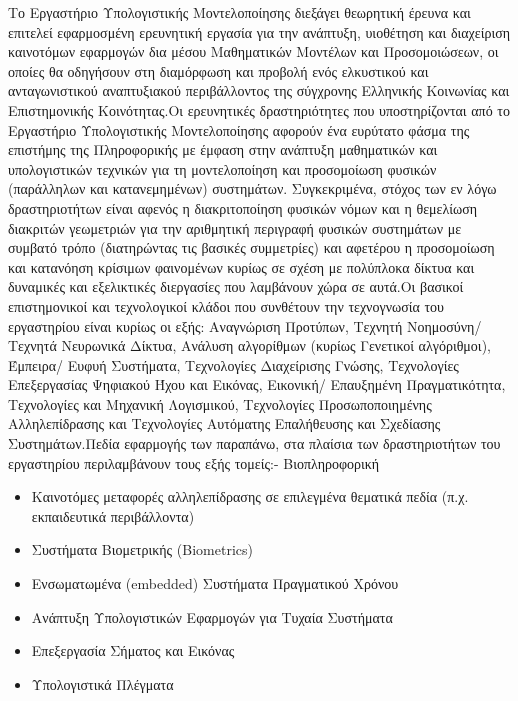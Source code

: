 Το Εργαστήριο Υπολογιστικής Μοντελοποίησης διεξάγει θεωρητική έρευνα και
επιτελεί εφαρμοσμένη ερευνητική εργασία για την ανάπτυξη, υιοθέτηση και
διαχείριση καινοτόμων εφαρμογών δια μέσου Μαθηματικών Μοντέλων και
Προσομοιώσεων, οι οποίες θα οδηγήσουν στη διαμόρφωση και προβολή ενός
ελκυστικού και ανταγωνιστικού αναπτυξιακού περιβάλλοντος της σύγχρονης
Ελληνικής Κοινωνίας και Επιστημονικής Κοινότητας.Οι ερευνητικές
δραστηριότητες που υποστηρίζονται από το Εργαστήριο Υπολογιστικής
Μοντελοποίησης αφορούν ένα ευρύτατο φάσμα της επιστήμης της Πληροφορικής
με έμφαση στην ανάπτυξη μαθηματικών και υπολογιστικών τεχνικών για τη
μοντελοποίηση και προσομοίωση φυσικών (παράλληλων και κατανεμημένων)
συστημάτων. Συγκεκριμένα, στόχος των εν λόγω δραστηριοτήτων είναι αφενός
η διακριτοποίηση φυσικών νόμων και η θεμελίωση διακριτών γεωμετριών για
την αριθμητική περιγραφή φυσικών συστημάτων με συμβατό τρόπο
(διατηρώντας τις βασικές συμμετρίες) και αφετέρου η προσομοίωση και
κατανόηση κρίσιμων φαινομένων κυρίως σε σχέση με πολύπλοκα δίκτυα και
δυναμικές και εξελικτικές διεργασίες που λαμβάνουν χώρα σε αυτά.Οι
βασικοί επιστημονικοί και τεχνολογικοί κλάδοι που συνθέτουν την
τεχνογνωσία του εργαστηρίου είναι κυρίως οι εξής: Αναγνώριση Προτύπων,
Τεχνητή Νοημοσύνη/ Τεχνητά Νευρωνικά Δίκτυα, Ανάλυση αλγορίθμων (κυρίως
Γενετικοί αλγόριθμοι), Έμπειρα/ Ευφυή Συστήματα, Τεχνολογίες Διαχείρισης
Γνώσης, Τεχνολογίες Επεξεργασίας Ψηφιακού Ήχου και Εικόνας, Εικονική/
Επαυξημένη Πραγματικότητα, Τεχνολογίες και Μηχανική Λογισμικού,
Τεχνολογίες Προσωποποιημένης Αλληλεπίδρασης και Τεχνολογίες Αυτόματης
Επαλήθευσης και Σχεδίασης Συστημάτων.Πεδία εφαρμογής των παραπάνω, στα
πλαίσια των δραστηριοτήτων του εργαστηρίου περιλαμβάνουν τους εξής
τομείς:- Βιοπληροφορική

\begin{itemize}
\item
  Καινοτόμες μεταφορές αλληλεπίδρασης σε επιλεγμένα θεματικά πεδία (π.χ.
  εκπαιδευτικά περιβάλλοντα)
\item
  Συστήματα Βιομετρικής (Biometrics)
\item
  Ενσωματωμένα (embedded) Συστήματα Πραγματικού Χρόνου
\item
  Ανάπτυξη Υπολογιστικών Εφαρμογών για Τυχαία Συστήματα
\item
  Επεξεργασία Σήματος και Εικόνας
\item
  Υπολογιστικά Πλέγματα
\end{itemize}
